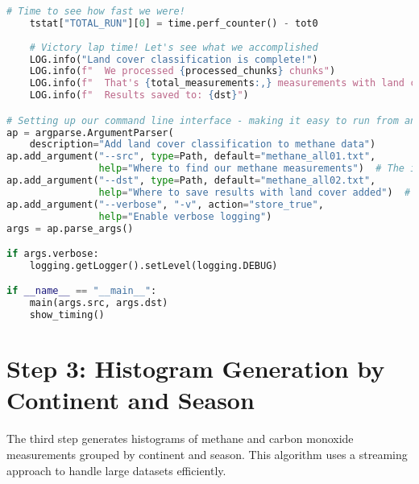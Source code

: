 \begin{lstlisting}[language=Python, caption=Land Cover Classification Addition Algorithm, label=alg:step02_add_lc, breaklines=true]
    # Time to see how fast we were!
    tstat["TOTAL_RUN"][0] = time.perf_counter() - tot0
    
    # Victory lap time! Let's see what we accomplished
    LOG.info("Land cover classification is complete!")
    LOG.info(f"  We processed {processed_chunks} chunks")
    LOG.info(f"  That's {total_measurements:,} measurements with land cover data!")
    LOG.info(f"  Results saved to: {dst}")

# Setting up our command line interface - making it easy to run from anywhere!
ap = argparse.ArgumentParser(
    description="Add land cover classification to methane data")
ap.add_argument("--src", type=Path, default="methane_all01.txt", 
                help="Where to find our methane measurements")  # The input file
ap.add_argument("--dst", type=Path, default="methane_all02.txt",
                help="Where to save results with land cover added")  # The output file
ap.add_argument("--verbose", "-v", action="store_true",
                help="Enable verbose logging")
args = ap.parse_args()

if args.verbose:
    logging.getLogger().setLevel(logging.DEBUG)

if __name__ == "__main__":
    main(args.src, args.dst)
    show_timing()
\end{lstlisting}

\section{Step 3: Histogram Generation by Continent and Season}
\label{sec:appendixB_step3}

The third step generates histograms of methane and carbon monoxide measurements grouped by continent and season. This algorithm uses a streaming approach to handle large datasets efficiently.

